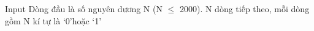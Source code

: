 Input
Dòng đầu là số nguyên dương N (N  $\le$  2000). N dòng tiếp theo, mỗi dòng gồm N kí tự là ‘0’hoặc ‘1’ 